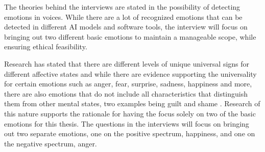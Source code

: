  The theories behind the interviews are stated in the possibility of detecting emotions in voices. While there are a lot of recognized emotions that can be detected in different AI models and software tools, the interview will focus on bringing out two different basic emotions to maintain a manageable scope, while ensuring ethical feasibility.

Research has stated that there are different levels of unique universal signs for different affective states and while there are evidence supporting the universality for certain emotions such as anger, fear, surprise, sadness, happiness and more, there are also emotions that do not include all characteristics that distinguish them from other mental states, two examples being guilt and shame \autocite{Ekman2011}. Research of this nature supports the rationale for having the focus solely on two of the basic emotions for this thesis. The questions in the interviews will focus on bringing out two separate emotions, one on the positive spectrum, happiness, and one on the negative spectrum, anger.
